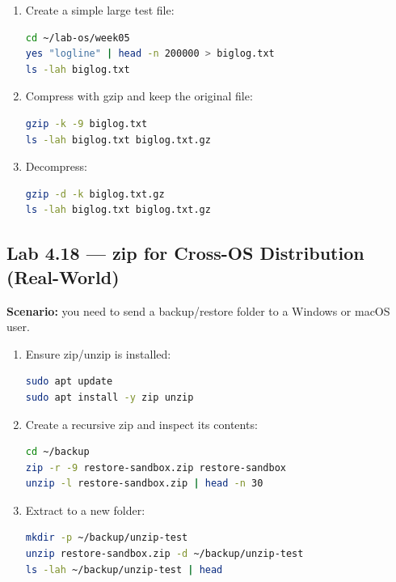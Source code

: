 \begin{enumerate}
    \item Create a simple large test file:
\begin{lstlisting}[language=bash, caption={Creating a large test file}]
cd ~/lab-os/week05
yes "logline" | head -n 200000 > biglog.txt
ls -lah biglog.txt
\end{lstlisting}

    \item Compress with gzip and keep the original file:
\begin{lstlisting}[language=bash, caption={gzip with keep}]
gzip -k -9 biglog.txt
ls -lah biglog.txt biglog.txt.gz
\end{lstlisting}

    \item Decompress:
\begin{lstlisting}[language=bash, caption={Decompress gzip}]
gzip -d -k biglog.txt.gz
ls -lah biglog.txt biglog.txt.gz
\end{lstlisting}
\end{enumerate}

\subsection*{Lab 4.18 --- zip for Cross-OS Distribution (Real-World)}
\textbf{Scenario:} you need to send a backup/restore folder to a Windows or
macOS user.

\begin{enumerate}
    \item Ensure zip/unzip is installed:
\begin{lstlisting}[language=bash, caption={Installing zip/unzip}]
sudo apt update
sudo apt install -y zip unzip
\end{lstlisting}

    \item Create a recursive zip and inspect its contents:
\begin{lstlisting}[language=bash, caption={Creating a zip and listing without extracting}]
cd ~/backup
zip -r -9 restore-sandbox.zip restore-sandbox
unzip -l restore-sandbox.zip | head -n 30
\end{lstlisting}

    \item Extract to a new folder:
\begin{lstlisting}[language=bash, caption={Extracting the zip to the target folder}]
mkdir -p ~/backup/unzip-test
unzip restore-sandbox.zip -d ~/backup/unzip-test
ls -lah ~/backup/unzip-test | head
\end{lstlisting}
\end{enumerate}

